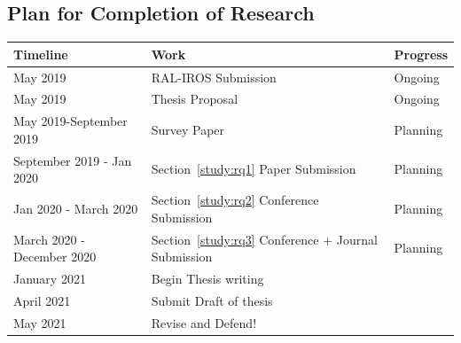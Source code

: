 \documentclass[12pt]{article}
\begin{document}
\subsection{Plan for Completion of Research}
\begin{center}
	\begin{tabular}{ m{5cm}  m{8cm} m{3cm} } 
		Timeline & Work & Progress \\
		\hline
		
		May 2019 & RAL-IROS Submission & Ongoing \\
		
		May 2019 & Thesis Proposal & Ongoing \\ 
		May 2019-September 2019 & Survey Paper & Planning \\
		September 2019 - Jan 2020 & Section~\ref{study:rq1} Paper Submission & Planning \\ 
		
		 Jan 2020 - March 2020 & Section~\ref{study:rq2} Conference Submission  & Planning \\
		 
		 March 2020 - December 2020 & Section~\ref{study:rq3} Conference + Journal Submission  & Planning \\
		 
		 January 2021 & Begin Thesis writing & \\
		 April 2021 & Submit Draft of thesis & \\
		 May 2021 & Revise and Defend! & \\
		  
		\hline
	\end{tabular}
\end{center}
\begin{footnotesize}


\end{footnotesize}
\end{document}
